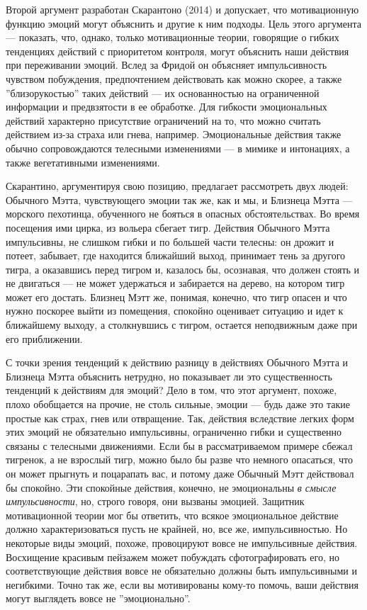 \documentclass[11pt]{book}
\begin{document}
Второй аргумент разработан Скарантоно (2014) и допускает, что мотивационную функцию эмоций могут объяснить и другие к ним подходы. Цель этого аргумента --- показать, что, однако, только мотивационные теории, говорящие о гибких тенденциях действий с приоритетом контроля, могут объяснить наши действия при переживании эмоций. Вслед за Фридой он объясняет импульсивность чувством побуждения, предпочтением действовать как можно скорее, а также ''близорукостью'' таких действий --- их основанностью на ограниченной информации и предвзятости в ее обработке. Для гибкости эмоциональных действий характерно присутствие ограничений на то, что можно считать действием из-за страха или гнева, например. Эмоциональные действия также обычно сопровождаются телесными изменениями --- в мимике и интонациях, а также вегетативными изменениями.

Скарантино, аргументируя свою позицию, предлагает рассмотреть двух людей: Обычного Мэтта, чувствующего эмоции так же, как и мы, и Близнеца Мэтта --- морского пехотинца, обученного не бояться в опасных обстоятельствах. Во время посещения ими цирка, из вольера сбегает тигр. Действия Обычного Мэтта импульсивны, не слишком гибки и по большей части телесны: он дрожит и потеет, забывает, где находится ближайший выход, принимает тень за другого тигра, а оказавшись перед тигром и, казалось бы, осознавая, что должен стоять и не двигаться --- не может удержаться и забирается на дерево, на котором тигр может его достать. Близнец Мэтт же, понимая, конечно, что тигр опасен и что нужно поскорее выйти из помещения, спокойно оценивает ситуацию и идет к ближайшему выходу, а столкнувшись с тигром, остается неподвижным даже при его приближении.

С точки зрения тенденций к действию разницу в действиях Обычного Мэтта и Близнеца Мэтта объяснить нетрудно, но показывает ли это существенность тенденций к действиям для эмоций? Дело в том, что этот аргумент, похоже, плохо обобщается на прочие, не столь сильные, эмоции --- будь даже это такие простые как страх, гнев или отвращение. Так, действия вследствие легких форм этих эмоций не обязательно импульсивны, ограниченно гибки и существенно связаны с телесными движениями. Если бы в рассматриваемом примере сбежал тигренок, а не взрослый тигр, можно было бы разве что немного опасаться, что он может прыгнуть и поцарапать вас, и потому даже Обычный Мэтт действовал бы спокойно. Эти спокойные действия, конечно, не эмоциональны \textit{в смысле импульсивности}, но, строго говоря, они вызваны эмоцией. Защитник мотивационной теории мог бы ответить, что всякое эмоциональное действие должно характеризоваться пусть не крайней, но, все же, импульсивностью. Но некоторые виды эмоций, похоже, провоцируют вовсе не импульсивные действия. Восхищение красивым пейзажем может побуждать сфотографировать его, но соответствующие действия вовсе не обязательно должны быть импульсивными и негибкими. Точно так же, если вы мотивированы кому-то помочь, ваши действия могут выглядеть вовсе не ''эмоционально''.
\end{document}
